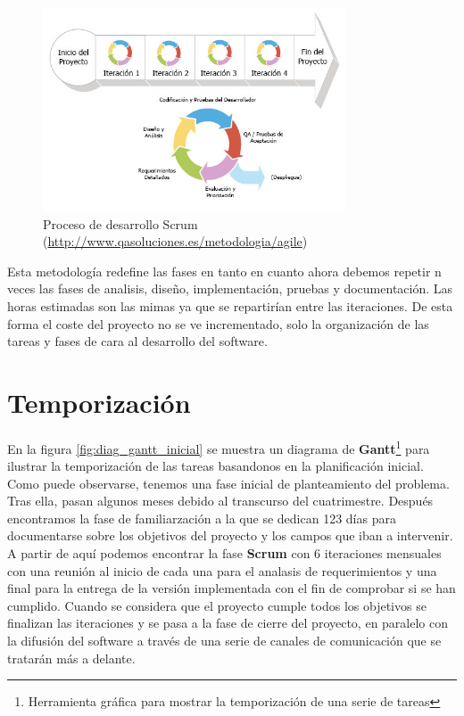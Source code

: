 \begin{figure}[!ht]
  \begin{center}
  \includegraphics[width=0.8\textwidth]{../images/scrum-iteration-detail-es.png}
  \caption{Proceso de desarrollo Scrum (\url{http://www.qasoluciones.es/metodologia/agile})}
  \label{fig:diag_scrum}
  \end{center}
\end{figure}

Esta metodología redefine las fases en tanto en cuanto ahora debemos repetir n veces las fases de analisis, diseño, implementación, pruebas y documentación. Las horas estimadas son las mimas ya que se repartirían entre las iteraciones. De esta forma el coste del proyecto no se ve incrementado, solo la organización de las tareas y fases de cara al desarrollo del software. 

\section{Temporización}

En la figura \ref{fig:diag_gantt_inicial} se muestra un diagrama de \textbf{Gantt}\footnote{Herramienta gráfica para mostrar la temporización de una serie de tareas} para ilustrar la temporización de las tareas basandonos en la planificación inicial. Como puede observarse, tenemos una fase inicial de planteamiento del problema. Tras ella, pasan algunos meses debido al transcurso del cuatrimestre. Después encontramos la fase de familiarzación a la que se dedican 123 días para documentarse sobre los objetivos del proyecto y los campos que iban a intervenir. A partir de aquí podemos encontrar la fase \textbf{Scrum} con 6 iteraciones mensuales con una reunión al inicio de cada una para el analasis de requerimientos y una final para la entrega de la versión implementada con el fin de comprobar si se han cumplido. Cuando se considera que el proyecto cumple todos los objetivos se finalizan las iteraciones y se pasa a la fase de cierre del proyecto, en paralelo con la difusión del software a través de una serie de canales de comunicación que se tratarán más a delante.

